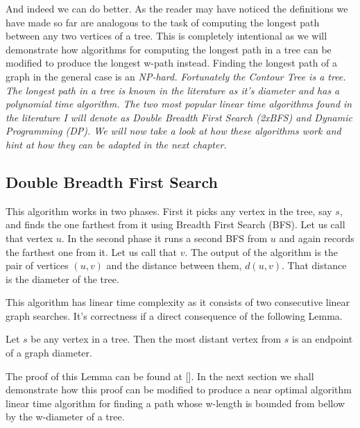 And indeed we can do better. As the reader may have noticed the definitions we have made so far are analogous to the task of computing the longest path between any two vertices of a tree. This is completely intentional as we will demonstrate how algorithms for computing the longest path in a tree can be modified to produce the longest w-path instead. Finding the longest path of a graph in the general case is an \em NP-hard\em. Fortunately the Contour Tree is a tree. The longest path in a tree is known in the literature as it's diameter and has a polynomial time algorithm. The two most popular linear time algorithms found in the literature I will denote as Double Breadth First Search (2xBFS) and Dynamic Programming (DP). We will now take a look at how these algorithms work and hint at how they can be adapted in the next chapter.


\subsection{Double Breadth First Search}

This algorithm works in two phases. First it picks any vertex in the tree, say $s$, and finds the one farthest from it using Breadth First Search (BFS). Let us call that vertex $u$. In the second phase it runs a second BFS from $u$ and again records the farthest one from it. Let us call that $v$. The output of the algorithm is the pair of vertices $(u, v)$ and the distance between them, $d(u, v)$. That distance is the diameter of the tree.

This algorithm has linear time complexity as it consists of two consecutive linear graph searches. It's correctness if a direct consequence of the following Lemma.

\begin{lem} Let $s$ be any vertex in a tree. Then the most distant vertex from $s$ is an endpoint of a graph diameter. \end{lem}


The proof of this Lemma can be found at []. In the next section we shall demonstrate how this proof can be modified to produce a near optimal algorithm linear time algorithm for finding a path whose w-length is bounded from bellow by the w-diameter of a tree.


